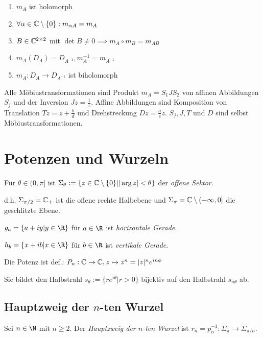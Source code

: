 \begin{enumerate}[label=(\alph*)]
	\item $m_A$ ist holomorph
	\item $\forall \alpha \in \mathbb{C} \setminus \{0\} : m_{\alpha A} = m_A$
	\item $B \in \mathbb{C}^{2 \times 2}$ mit $\det B \neq 0 \implies m_A \circ m_{B} = m_{AB}$
	\item $m_A(D_A) = D_{A^{-1}}, m_A^{-1} = m_{A^{-1}}$
	\item $m_A : D_A \to D_{A^{-1}}$ ist biholomorph
\end{enumerate}

Alle Möbiustransformationen sind Produkt $m_A = S_1 J S_2$ von affinen Abbildungen $S_j$ und der Inversion $Jz = \frac{1}{z}$. Affine Abbildungen sind Komposition von Translation $Tz=z+\frac{b}{d}$ und Drehstreckung $Dz = \frac{a}{c} z$. $S_j, J, T$ und $D$ sind selbst Möbiustransformationen.

\section*{Potenzen und Wurzeln}

Für $\theta \in (0, \pi]$ ist $\Sigma_\theta := \{ z \in \mathbb{C} \setminus \{0\} | |\arg z| < \theta \}$ der \emph{offene Sektor}.

d.h. $\Sigma_{\pi / 2} = \mathbb{C}_+$ ist die offene rechte Halbebene und $\Sigma_\pi = \mathbb{C} \setminus (-\infty,0]$ die geschlitzte Ebene.

\vspace*{2mm}

$g_a = \{ a + iy | y \in \R \}$ für $a \in \R$ ist \emph{horizontale Gerade}.

$h_b = \{ x + ib | x \in \R \}$ für $b \in \R$ ist \emph{vertikale Gerade}.

\vspace*{2mm}

Die Potenz ist def.: $P_n : \mathbb{C} \to \mathbb{C}, z \mapsto z^n = |z|^n e^{in\phi}$

Sie bildet den Halbstrahl $s_\theta := \{ re^{i\theta} | r > 0 \}$ bijektiv auf den Halbstrahl $s_{n\theta}$ ab.

\subsection*{Hauptzweig der $n$-ten Wurzel}

Sei $n \in \N$ mit $n \geq 2$. Der \emph{Hauptzweig der $n$-ten Wurzel} ist $r_n = p_n^{-1} : \Sigma_\pi \to \Sigma_{\pi/n}$.

